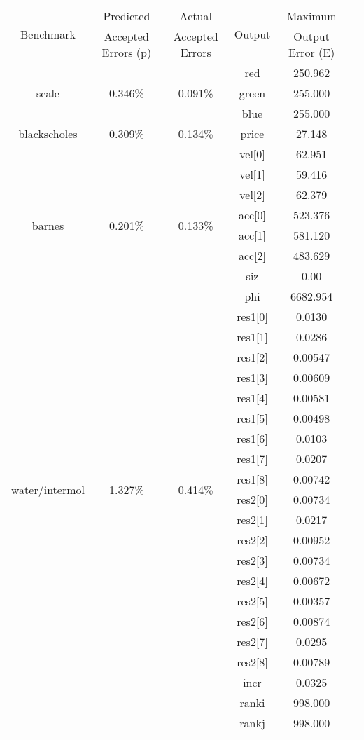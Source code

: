 \documentclass[11pt]{article}
\begin{document}
\begin {table*}[t]
\centering
\begin{tabular}{c|ccccc}
	\multirow{2}{*}{Benchmark} & Predicted  & Actual & \multirow{2}{*}{Output} & Maximum\\
	 &  Accepted Errors (p) & Accepted Errors &  &  Output Error (E)\\
	\hline
	\multirow{3}{*}{scale} & \multirow{3}{*}{0.346\%} & \multirow{3}{*}{0.091\%} & red & 250.962\\
	&  &  & green & 255.000\\
	&  &  & blue & 255.000\\
	\hline
	\multirow{1}{*}{blackscholes} & \multirow{1}{*}{0.309\%} & \multirow{1}{*}{0.134\%} & price & 27.148\\
	\hline
	\multirow{8}{*}{barnes} & \multirow{8}{*}{0.201\%} & \multirow{8}{*}{0.133\%} & vel[0] & 62.951\\
	&  &  & vel[1] & 59.416\\
	&  &  & vel[2] & 62.379\\
	&  &  & acc[0] & 523.376\\
	&  &  & acc[1] & 581.120\\
	&  &  & acc[2] & 483.629\\
	&  &  & siz & 0.00\\
	&  &  & phi & 6682.954\\
	\hline
	\multirow{18}{*}{water/intermol} & \multirow{18}{*}{1.327\%} & \multirow{18}{*}{0.414\%} & res1[0] &0.0130\\
	&  &  & res1[1] & 0.0286\\
	&  &  & res1[2] & 0.00547\\
	&  &  & res1[3] & 0.00609\\
	&  &  & res1[4] & 0.00581\\
	&  &  & res1[5] & 0.00498\\
	&  &  & res1[6] & 0.0103\\
	&  &  & res1[7] &0.0207\\
	&  &  & res1[8] & 0.00742\\
	&  &  & res2[0] & 0.00734\\
	&  &  & res2[1] & 0.0217\\
	&  &  & res2[2] & 0.00952\\
	&  &  & res2[3] & 0.00734\\
	&  &  & res2[4] & 0.00672\\
	&  &  & res2[5] & 0.00357\\
	&  &  & res2[6] & 0.00874\\
	&  &  & res2[7] & 0.0295\\
	&  &  & res2[8] &0.00789 \\
	&  &  & incr & 0.0325\\
	&  &  & ranki & 998.000\\
	&  &  & rankj & 998.000\\
	

\end{tabular}
\end{table*}
\end{document}
